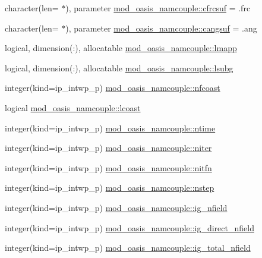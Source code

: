 \begin{DoxyCompactItemize}
\item 
character(len= $\ast$), parameter \hyperlink{namespacemod__oasis__namcouple_aa2b2f64544e85c57f11059d22d0b2463}{mod\+\_\+oasis\+\_\+namcouple\+::cfrcsuf} = \textquotesingle{}.frc\textquotesingle{}
\item 
character(len= $\ast$), parameter \hyperlink{namespacemod__oasis__namcouple_a1fa86c01625d68460bf58d903a623011}{mod\+\_\+oasis\+\_\+namcouple\+::cangsuf} = \textquotesingle{}.ang\textquotesingle{}
\item 
logical, dimension(\+:), allocatable \hyperlink{namespacemod__oasis__namcouple_a8eca7c715a39c523e00ed2be0612950d}{mod\+\_\+oasis\+\_\+namcouple\+::lmapp}
\item 
logical, dimension(\+:), allocatable \hyperlink{namespacemod__oasis__namcouple_acda1605129987d656360e1ed81e8d199}{mod\+\_\+oasis\+\_\+namcouple\+::lsubg}
\item 
integer(kind=ip\+\_\+intwp\+\_\+p) \hyperlink{namespacemod__oasis__namcouple_a57f1b6f111a5257a4d6f5a4b18fa6250}{mod\+\_\+oasis\+\_\+namcouple\+::nfcoast}
\item 
logical \hyperlink{namespacemod__oasis__namcouple_a7657e0f9b495e291f26dc31b4f6145aa}{mod\+\_\+oasis\+\_\+namcouple\+::lcoast}
\item 
integer(kind=ip\+\_\+intwp\+\_\+p) \hyperlink{namespacemod__oasis__namcouple_a8a962108487c3ca092633bd4292dbfd6}{mod\+\_\+oasis\+\_\+namcouple\+::ntime}
\item 
integer(kind=ip\+\_\+intwp\+\_\+p) \hyperlink{namespacemod__oasis__namcouple_a6246780a56635119fd8f7935456b06cf}{mod\+\_\+oasis\+\_\+namcouple\+::niter}
\item 
integer(kind=ip\+\_\+intwp\+\_\+p) \hyperlink{namespacemod__oasis__namcouple_a1e5b5efd046e5ab959fba026bd645945}{mod\+\_\+oasis\+\_\+namcouple\+::nitfn}
\item 
integer(kind=ip\+\_\+intwp\+\_\+p) \hyperlink{namespacemod__oasis__namcouple_a66c36f23a77081749dc9e7993b0277f3}{mod\+\_\+oasis\+\_\+namcouple\+::nstep}
\item 
integer(kind=ip\+\_\+intwp\+\_\+p) \hyperlink{namespacemod__oasis__namcouple_a674f201daa7f2e1ba4c71221bda91d9c}{mod\+\_\+oasis\+\_\+namcouple\+::ig\+\_\+nfield}
\item 
integer(kind=ip\+\_\+intwp\+\_\+p) \hyperlink{namespacemod__oasis__namcouple_a531825c07a164f6139e5eebd59e295a2}{mod\+\_\+oasis\+\_\+namcouple\+::ig\+\_\+direct\+\_\+nfield}
\item 
integer(kind=ip\+\_\+intwp\+\_\+p) \hyperlink{namespacemod__oasis__namcouple_a3de3e6eb2bf1e81d77e9c117b7d5985f}{mod\+\_\+oasis\+\_\+namcouple\+::ig\+\_\+total\+\_\+nfield}

\end{DoxyCompactItemize}
